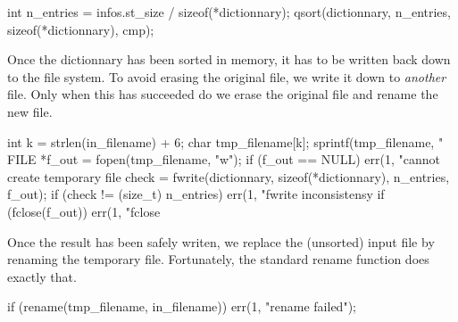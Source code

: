 \documentclass{article}%
\begin{document}
\nwendcode{}\endmoddef\nwstartdeflinemarkup{}\nwenddeflinemarkup
int n_entries = infos.st_size / sizeof(*dictionnary);
qsort(dictionnary, n_entries, sizeof(*dictionnary), cmp);

\nwendcode{}Once the dictionnary has been sorted in memory, it has to be written back
down to the file system. To avoid erasing the original file, we write it down
to \emph{another} file. Only when this has succeeded do we erase the original
file and rename the new file.

\nwenddocs{}\endmoddef\nwstartdeflinemarkup{}\nwenddeflinemarkup
int k = strlen(in_filename) + 6;
char tmp_filename[k];
sprintf(tmp_filename, "%
FILE *f_out = fopen(tmp_filename, "w");
if (f_out == NULL)
        err(1, "cannot create temporary file %
check = fwrite(dictionnary, sizeof(*dictionnary), n_entries, f_out);
if (check != (size_t) n_entries)
        err(1, "fwrite inconsistensy %
if (fclose(f_out))
        err(1, "fclose %

\nwendcode{}Once the result has been safely writen, we replace the (unsorted) input file
by renaming the temporary file. Fortunately, the standard {\Tt{}rename\nwendquote} function
does exactly that.

\nwenddocs{}\endmoddef\nwstartdeflinemarkup{}\nwenddeflinemarkup
if (rename(tmp_filename, in_filename))
        err(1, "rename failed");
\end{document}
